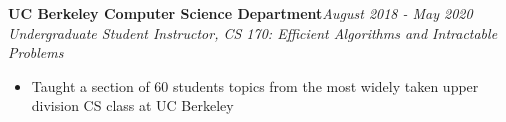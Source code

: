 \documentclass[letterpaper,8pt]{article}
\newcommand{\resitem}[1]{\item #1 \vspace{-1pt}}
\begin{document}
{\begin{itemize}[noitemsep]
{%



    \item
	\textbf{UC Berkeley Computer Science Department}\hfill{\textit{August 2018 - May 2020}} \\
	\textit{Undergraduate Student Instructor, CS 170: Efficient Algorithms and Intractable Problems}
	\begin{itemize}[noitemsep,nolistsep]
		\resitem{\small{Taught a section of 60 students topics from the most widely taken upper division CS class at UC Berkeley}}
	\end{itemize}



}


\end{itemize}

}
\end{document}
